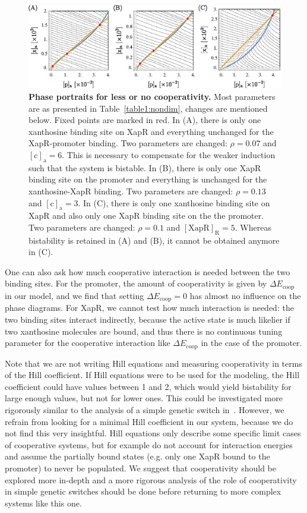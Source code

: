 \documentclass[10pt,letterpaper]{article}
\newcommand{\n}[1]{\mathrm{#1}}
\begin{document}
	\begin{figure}%
		\centering
		\includegraphics{media/FewerSites.eps}
		\caption{{\bf Phase portraits for less or no cooperativity.}
			Most parameters are as presented in Table~\ref{table1:nondim},
			changes are mentioned below. Fixed points are marked in red. In (A),
			there is only one xanthosine binding site on XapR and everything
			unchanged for the XapR-promoter binding. Two parameters are changed:
			$\rho = 0.07$ and $\n{[c]_a} = 6$. This is necessary to compensate
			for the weaker induction such that the system is bistable. In (B),
			there is only one XapR binding site on the promoter and everything
			is unchanged for the xanthosine-XapR binding. Two parameters are
			changed: $\rho = 0.13$ and $\n{[c]_a} = 3$. In (C), there is only
			one xanthosine binding site on XapR and also only one XapR binding
			site on the the promoter. Two parameters are changed: $\rho = 0.1$
			and $\n{[XapR]_R} = 5$. Whereas bistability is retained in (A) and
			(B), it cannot be obtained anymore in (C).}
		\label{fig7:coop}
	\end{figure}
	
	One can also ask how much cooperative interaction is needed between the two
	binding sites. For the promoter, the amount of cooperativity is given by $\Delta E_{\n{coop}}$ in
	our model, and we find that setting $\Delta E_{\n{coop}} = 0$ has almost no
	influence on the phase diagrams. For XapR, we cannot test how much interaction is needed: the two binding sites interact
	indirectly, because the active state is much likelier if two xanthosine
	molecules are bound, and thus there is no continuous tuning parameter for the cooperative interaction
	like $\Delta E_{\n{coop}}$ in the case of the promoter.
	
	Note that we are not writing Hill equations and measuring cooperativity in
	terms of the Hill coefficient. If Hill equations were to be used for the
	modeling, the Hill coefficient could have values between 1 and 2, which
	would yield bistability for large enough values, but not for lower ones.
	This could be investigated more rigorously similar to the analysis of a
	simple genetic switch in~\cite{Cherry2000}. However, we refrain from looking
	for a minimal Hill coefficient in our system, because we do not find this
	very insightful. Hill equations only describe some specific limit cases of cooperative systems, but for example do not account for interaction energies and assume the partially bound states (e.g. only one XapR bound to the promoter) to never be populated.
	We suggest that cooperativity should be explored more in-depth and a more
	rigorous analysis of the role of cooperativity in simple genetic switches
	should be done before returning to more complex systems like this one.
	
\end{document}
